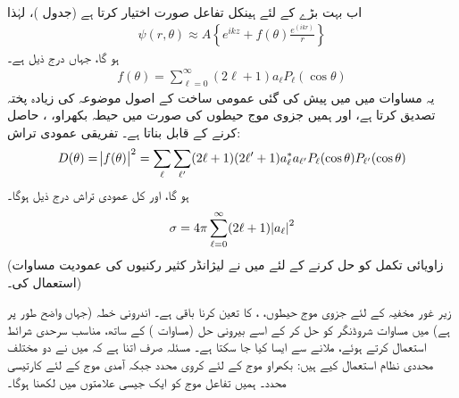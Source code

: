 اب بہت بڑے  کے لئے ہینکل تفاعل  صورت اختیار کرتا ہے (جدول )، لہٰذا
\begin{align}
	\psi(r, \theta)\approx A\left\{e^{ikz}+f(\theta)\frac{e^{(ikr)}}{r}\right\}
\end{align}
ہو گا، جہاں  درج ذیل ہے۔
\begin{align}\label{مساوات_بکھراو_بکھراو_حیطہ}
	f(\theta) = \sum_{\ell=0}^{\infty}(2\ell +1)a_{\ell}P_{\ell}(\cos\theta)
\end{align}
یہ مساوات  میں میں پیش کی گئی عمومی ساخت کے اصول موضوعہ کی زیادہ پختہ تصدیق کرتا ہے، اور ہمیں جزوی موج حیطوں  کی صورت میں حیطہ بکھراو، ، حاصل کرنے کے قابل بناتا ہے۔ تفریقی عمودی تراش:
\begin{align}
	D(\theta) = \abs{f(\theta)}^2 = \sum_{\ell}\sum_{\ell'}(2\ell+1)(2\ell'+1)a^*_{\ell}a_{\ell'}P_{\ell}(\cos\theta)P_{\ell'}(\cos\theta)
\end{align}
ہو گا، اور کل عمودی تراش درج ذیل ہوگا۔
\begin{align}\label{مساوات_بکھراو_کل_عمودی_تراش}
	\sigma=4\pi\sum_{\ell=0}^{\infty}(2\ell+1)\abs{a_{\ell}}^2
\end{align}
(زاویائی تکمل کو حل کرنے کے لئے میں نے لیژانڈر کثیر رکنیوں کی عمودیت مساوات  استعمال کی۔)


زیر غور مخفیہ کے لئے جزوی موج حیطوں، ، کا تعین کرنا باقی ہے۔ اندرونی خطہ (جہاں  واضح طور پر  ہے) میں مساوات شروڈنگر کو حل کر کے اسے بیرونی حل (مساوات ) کے ساتھ، مناسب سرحدی شرائط استعمال کرتے ہوئے، ملانے سے ایسا کیا جا سکتا ہے۔ مسئلہ صرف اتنا ہے کہ میں نے دو مختلف محددی نظام استعمال کیے ہیں: بکھراو موج کے لئے کروی محدد جبکہ آمدی موج کے لئے کارتیسی محدد۔ ہمیں تفاعل موج کو ایک جیسی علامتوں میں لکھنا ہوگا۔

